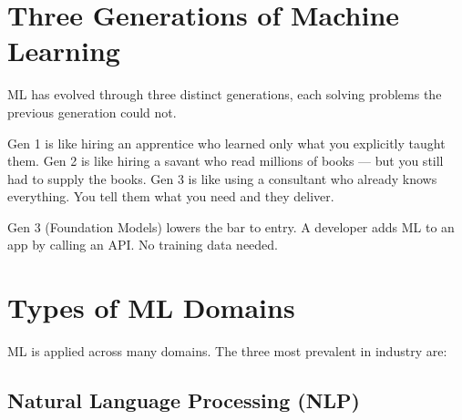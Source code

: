 \documentclass[a4paper,11pt]{article}
\begin{document}
\section{Three Generations of Machine Learning}

ML has evolved through three distinct generations, each solving problems the previous generation could not.

\begin{center}
\end{center}

\begin{everyday}
Gen 1 is like hiring an apprentice who learned only what you explicitly taught them. Gen 2 is like hiring a savant who read millions of books --- but you still had to supply the books. Gen 3 is like using a consultant who already knows everything. You tell them what you need and they deliver.
\end{everyday}

\begin{keytake}
Gen 3 (Foundation Models) lowers the bar to entry. A developer adds ML to an app by calling an API. No training data needed.
\end{keytake}

\section{Types of ML Domains}

ML is applied across many domains. The three most prevalent in industry are:

\subsection{Natural Language Processing (NLP)}
\end{document}
